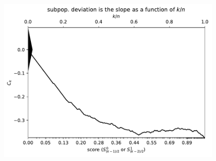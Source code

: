 \documentclass{article}
\newlength{\vertsep}
\newlength{\imsize}
\begin{document}
\begin{figure}
\begin{centering}

\parbox{\imsize}{\includegraphics[width=\imsize]
{../codes/unweighted/nll-1-248-Eskimo-dog-husky_293-cheetah-chetah-Acinonyx-jubatus.pdf}}

\vspace{\vertsep}


\end{centering}
\end{figure}
\end{document}
